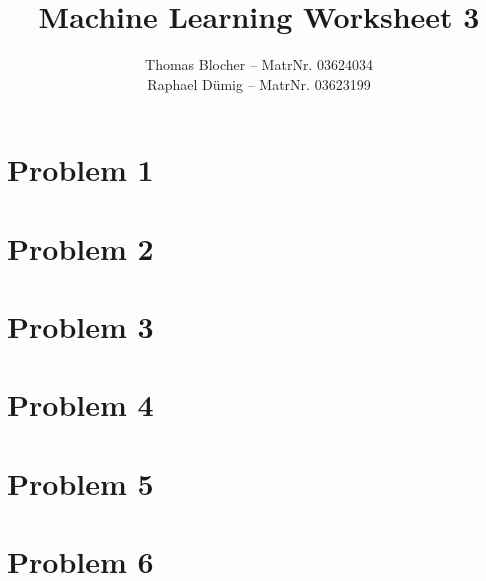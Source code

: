 \documentclass{scrartcl}
\title{Machine Learning Worksheet 3}
\author{Thomas Blocher -- MatrNr. 03624034 \\ Raphael D\"umig -- MatrNr. 03623199}
\begin{document}
\maketitle

\section*{Problem 1}


\section*{Problem 2}


\section*{Problem 3}


\section*{Problem 4}


\section*{Problem 5}


\section*{Problem 6}

\end{document}
